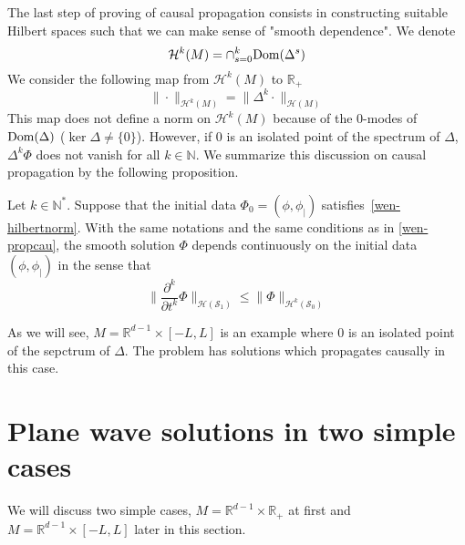%
The last step of proving of causal propagation consists in constructing suitable Hilbert spaces such that we can make sense of "smooth dependence". 
We denote 
\begin{equation*}
\mathcal{H}^k(M) = \cap_{s=0}^{k} \mathrm{Dom}(\Delta^s)
\end{equation*}
We consider the following map from $\mathcal{H}^k(M)$ to $\mathbb{R}_+$
\begin{equation}\label{wen-hilbertnorm}
\| \cdot \|_{\mathcal{H}^k(M)} = \| \Delta^k \cdot \|_{\mathcal{H}(M)}
\end{equation}
This map does not define a norm on $\mathcal{H}^k(M)$ because of the 0-modes of $\mathrm{Dom}(\Delta)$ ($\ker \Delta \neq \{0\}$).
However, 
if 0 is an isolated point of the spectrum of $\Delta$, $\Delta^k \Phi$ does not vanish for all $k\in\mathbb{N}$.
We summarize this discussion on causal propagation by the following proposition.
\begin{proposition}
Let $k \in \mathbb{N}^*$.
Suppose that the initial data $\Phi_0 = (\phi, \phi_|)$ satisfies~\cref{wen-hilbertnorm}.
With the same notations and the same conditions as in \cref{wen-propcau}, 
the smooth solution $\Phi$ depends continuously on the initial data $(\phi, \phi_|)$ in the sense that
\begin{equation*}
\big\| \frac{\partial^k}{\partial t^k} \Phi\big\|_{\mathcal{H}(\mathcal{S}_1)}
\leq
\big\| \Phi\big\|_{\mathcal{H}^{k}(\mathcal{S}_0)}
\end{equation*}
\end{proposition}
%
\begin{remark}
As we will see, $M = \mathbb{R}^{d-1}\times[-L,L]$ is an example where 0 is an isolated point of the sepctrum of $\Delta$. 
The problem has solutions which propagates causally in this case.
\end{remark}
\section{Plane wave solutions in two simple cases}
We will discuss two simple cases, $M = \mathbb{R}^{d-1} \times \mathbb{R}_+$ at first and $M = \mathbb{R}^{d-1} \times [-L, L]$ later in this section. 






